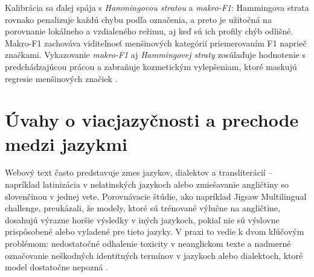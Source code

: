 Kalibrácia sa ďalej spája s \emph{Hammingovou stratou} a \emph{makro-F1}: Hammingova strata rovnako penalizuje každú chybu podľa označenia, a preto je užitočná na porovnanie lokálneho a vzdialeného režimu, aj keď sú ich profily chýb odlišné. Makro-F1 zachováva viditeľnosť menšinových kategórií priemerovaním F1 naprieč značkami. Vykazovanie \emph{makro-F1} aj \emph{Hammingovej straty} zosúlaďuje hodnotenie s predchádzajúcou prácou a zabraňuje kozmetickým vylepšeniam, ktoré maskujú regresie menšinových značiek \cite{tsoumakas2007multilabel}\cite{jigsaw2018toxic}\cite{sikiandani2025browser}\cite{borkan2019nuanced}\cite{sklearnF1}\cite{sklearnHamming}.

\section{Úvahy o viacjazyčnosti a prechode medzi jazykmi}
Webový text často predstavuje zmes jazykov, dialektov a transliterácií – napríklad latinizácia v nelatinských jazykoch alebo zmiešavanie angličtiny so slovenčinou v jednej vete. Porovnávacie štúdie, ako napríklad Jigsaw Multilingual challenge, preukázali, že modely, ktoré sú trénované výlučne na angličtine, dosahujú výrazne horšie výsledky v iných jazykoch, pokiaľ nie sú výslovne prispôsobené alebo vyladené pre tieto jazyky. V praxi to vedie k dvom kľúčovým problémom: nedostatočné odhalenie toxicity v neanglickom texte a nadmerné označovanie neškodných identitných termínov v jazykoch alebo dialektoch, ktoré model dostatočne nepozná \cite{jigsaw2019bias}\cite{jigsaw2020multilingual}\cite{hatexplain2021}\cite{sap2019racialbias}\cite{toxigen2022}\cite{xlmr2020}.

